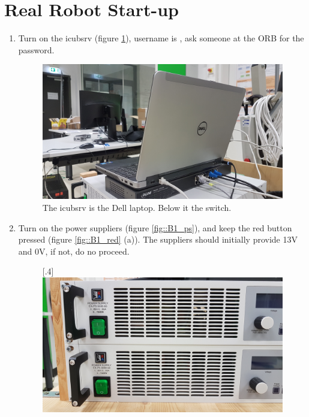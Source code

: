 \section{Real Robot Start-up}
\label{sec::B1_rr}
\begin{enumerate}
	\item Turn on the icubsrv (figure \ref{fig::B1_icubsrv}), username is , ask someone at the ORB for the password.%
	\begin{figure}[h!]
		\centering
		\includegraphics[scale=.04]{chapters/13_appendix/img/icubsrv.jpg}
		\caption{The icubsrv is the Dell laptop. Below it the switch.}
		\label{fig::B1_icubsrv}
	\end{figure}
	\item Turn on the power suppliers (figure \ref{fig::B1_ps}), and keep the red button pressed (figure \ref{fig::B1_red} (a)). The suppliers should initially provide 13V and 0V, if not, do no proceed.
	\begin{figure}[h!]
		\centering
		[.4\linewidth]{\includegraphics[scale=.04]{chapters/13_appendix/img/power_supply.jpg}}

\end{figure}
\end{enumerate}
